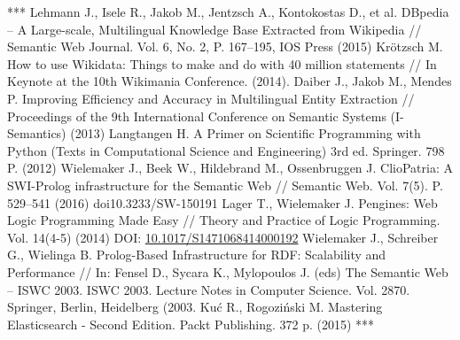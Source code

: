 \documentclass[12pt]{llncs}
\begin{document}
\begin{thebibliography}{99}
 ***
  Lehmann J., Isele R., Jakob M., Jentzsch A., Kontokostas D., et al.
  DBpedia -- A Large-scale, Multilingual Knowledge Base Extracted from
  Wikipedia // Semantic Web Journal. Vol. 6, No. 2, P. 167--195,
  IOS Press (2015)
  Krötzsch M. How to use Wikidata: Things to make and do with 40 million
  statements // In Keynote at the 10th Wikimania Conference. (2014).
  Daiber J., Jakob M., Mendes P. Improving Efficiency and Accuracy in
  Multilingual Entity Extraction // Proceedings of the 9th International
  Conference on Semantic Systems (I-Semantics) (2013)
  Langtangen H. A Primer on Scientific Programming with Python (Texts in
  Computational Science and Engineering) 3rd ed. Springer. 798 P. (2012)
  Wielemaker J., Beek W., Hildebrand M., Ossenbruggen J. ClioPatria: A
  SWI-Prolog infrastructure for the Semantic Web // Semantic Web.
  Vol. 7(5). P. 529--541 (2016) doi{10.3233/SW-150191}
  Lager T., Wielemaker J. Pengines: Web Logic Programming Made Easy //
  Theory and Practice of Logic Programming. Vol. 14(4-5) (2014)
DOI: \url{10.1017/S1471068414000192}
  Wielemaker J., Schreiber G., Wielinga B. Prolog-Based Infrastructure
  for RDF: Scalability and Performance // In: Fensel D., Sycara K.,
  Mylopoulos J. (eds) The Semantic Web -- ISWC 2003. ISWC 2003. Lecture
  Notes in Computer Science. Vol. 2870. Springer, Berlin,
  Heidelberg (2003.
  Kuć R., Rogoziński M. Mastering Elasticsearch - Second Edition. Packt
  Publishing. 372 p. (2015)
 ***

\end{thebibliography}
\end{document}
